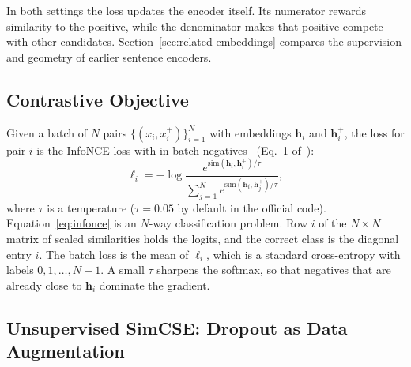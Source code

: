 In both settings the loss updates the encoder itself. Its numerator rewards
similarity to the positive, while the denominator makes that positive
compete with other candidates. Section~\ref{sec:related-embeddings}
compares the supervision and geometry of earlier sentence encoders.

\subsection{Contrastive Objective}
\label{sec:method-objective}

Given a batch of $N$ pairs $\{(x_i,x_i^+)\}_{i=1}^N$ with embeddings
$\mathbf{h}_i$ and $\mathbf{h}_i^+$, the loss for pair $i$ is the InfoNCE loss
with in-batch negatives~\cite{pmlr-v119-chen20j} (Eq.~1
of~\cite{gao-etal-2021-simcse}):
\begin{equation}
\ell_i = -\log
  \frac{e^{\mathrm{sim}(\mathbf{h}_i,\mathbf{h}_i^+)/\tau}}
       {\sum_{j=1}^{N} e^{\mathrm{sim}(\mathbf{h}_i,\mathbf{h}_j^+)/\tau}},
\label{eq:infonce}
\end{equation}
where $\tau$ is a temperature ($\tau=0.05$ by default in the official code).
Equation~\eqref{eq:infonce} is an $N$-way classification problem. Row $i$ of
the $N\times N$ matrix of scaled similarities holds the logits, and the correct
class is the diagonal entry $i$. The batch loss is the mean of $\ell_i$, which
is a standard cross-entropy with labels $0,1,\dots,N-1$. A small $\tau$
sharpens the softmax, so that negatives that are already close to $\mathbf{h}_i$
dominate the gradient.

\subsection{Unsupervised SimCSE: Dropout as Data Augmentation}
\label{sec:method-unsup}

